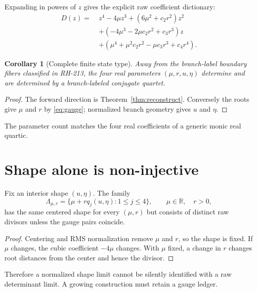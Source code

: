 \documentclass[12pt]{article}
\newtheorem{corollary}[theorem]{Corollary}
\theoremstyle{remark}\newtheorem{remark}[theorem]{Remark}
\begin{document}
Expanding in powers of $z$ gives the explicit raw coefficient dictionary:
\begin{equation}\label{eq:rawcoeffs}
\begin{aligned}
 D(z)=\;&z^4-4\mu z^3+(6\mu^2+c_2r^2)z^2\\
 &+(-4\mu^3-2\mu c_2r^2+c_3r^3)z\\
 &+(\mu^4+\mu^2c_2r^2-\mu c_3r^3+c_4r^4).
\end{aligned}
\end{equation}

\begin{corollary}[Complete finite state type]\label{cor:complete}
Away from the branch-label boundary fibers classified in RH-213, the four
real parameters $(\mu,r,u,\eta)$ determine and are determined by a
branch-labeled conjugate quartet.
\end{corollary}
\begin{proof}
The forward direction is Theorem~\ref{thm:reconstruct}.  Conversely the roots
give $\mu$ and $r$ by \eqref{eq:gauge}; normalized branch geometry gives
$u$ and $\eta$.
\end{proof}

The parameter count matches the four real coefficients of a generic monic
real quartic.

\section{Shape alone is non-injective}

\begin{proposition}\label{prop:noninjective}
Fix an interior shape $(u,\eta)$.  The family
\begin{equation}
 \Lambda_{\mu,r}=\{\mu+rq_j(u,\eta):1\le j\le4\},
 \qquad \mu\in\mathbb R,\quad r>0,
\end{equation}
has the same centered shape for every $(\mu,r)$ but consists of distinct raw
divisors unless the gauge pairs coincide.
\end{proposition}
\begin{proof}
Centering and RMS normalization remove $\mu$ and $r$, so the shape is fixed.
If $\mu$ changes, the cubic coefficient $-4\mu$ changes.  With $\mu$ fixed,
a change in $r$ changes root distances from the center and hence the divisor.
\end{proof}

Therefore a normalized shape limit cannot be silently identified with a raw
determinant limit.  A growing construction must retain a gauge ledger.
\end{document}
